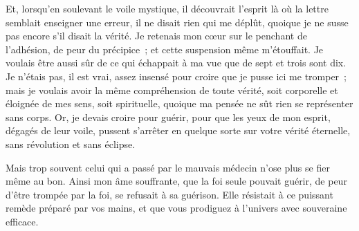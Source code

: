 \documentclass[french,twoside]{book} %
\begin{document}
\noindent Et, lorsqu’en soulevant le voile mystique, il découvrait l’esprit là où la lettre semblait enseigner une erreur, il ne disait rien qui me déplût, quoique je ne susse pas encore s’il disait la vérité. Je retenais mon cœur sur le penchant de l’adhésion, de peur du précipice ; et cette suspension même m’étouffait. Je voulais être aussi sûr de ce qui échappait à ma vue que de sept et trois sont dix. Je n’étais pas, il est vrai, assez insensé pour croire que je pusse ici me tromper ; mais je voulais avoir la même compréhension de toute vérité, soit corporelle et éloignée de mes sens, soit spirituelle, quoique ma pensée ne sût rien se représenter sans corps. Or, je devais croire pour guérir, pour que les yeux de mon esprit, dégagés de leur voile, pussent s’arrêter en quelque sorte sur votre vérité éternelle, sans révolution et sans éclipse.\par
Mais trop souvent celui qui a passé par le mauvais médecin n’ose plus se fier même au bon. Ainsi mon âme souffrante, que la foi seule pouvait guérir, de peur d’être trompée par la foi, se refusait à sa guérison. Elle résistait à ce puissant remède préparé par vos mains, et que vous prodiguez à l’univers avec souveraine efficace.
\end{document}
